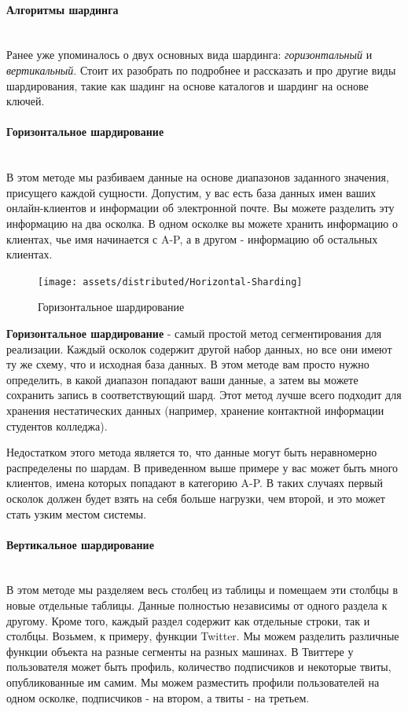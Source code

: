 \paragraph{Алгоритмы шардинга} ~\\
Ранее уже упоминалось о двух основных вида шардинга: \textit{горизонтальный} и \textit{вертикальный}. Стоит их разобрать по подробнее и
рассказать и про другие виды шардирования, такие как шадинг на основе каталогов и шардинг на основе ключей.

\paragraph{Горизонтальное шардирование} ~\\
В этом методе мы разбиваем данные на основе диапазонов заданного значения, присущего каждой сущности. Допустим, у вас
есть база данных имен ваших онлайн-клиентов и информации об электронной почте. Вы можете разделить эту информацию на
два осколка. В одном осколке вы можете хранить информацию о клиентах, чье имя начинается с A-P, а в другом - информацию
об остальных клиентах.

\begin{figure}[H]
    \centering
    \texttt{[image: assets/distributed/Horizontal-Sharding]}
    \caption{Горизонтальное шардирование}
    \label{fig:Horizontal-Sharding}
\end{figure}

\textbf{Горизонтальное шардирование} - самый простой метод сегментирования для реализации. Каждый осколок содержит
другой набор данных, но все они имеют ту же схему, что и исходная база данных. В этом методе вам просто нужно
определить, в какой диапазон попадают ваши данные, а затем вы можете сохранить запись в соответствующий шард. Этот
метод лучше всего подходит для хранения нестатических данных (например, хранение контактной информации студентов
колледжа).

Недостатком этого метода является то, что данные могут быть неравномерно распределены по шардам. В приведенном выше
примере у вас может быть много клиентов, имена которых попадают в категорию A-P. В таких случаях первый осколок должен
будет взять на себя больше нагрузки, чем второй, и это может стать узким местом системы. \autocite{DatabaseSharding}

\paragraph{Вертикальное шардирование} ~\\
В этом методе мы разделяем весь столбец из таблицы и помещаем эти столбцы в новые отдельные таблицы. Данные полностью
независимы от одного раздела к другому. Кроме того, каждый раздел содержит как отдельные строки, так и столбцы. Возьмем,
к примеру, функции Twitter. Мы можем разделить различные функции объекта на разные сегменты на разных машинах. В
Твиттере у пользователя может быть профиль, количество подписчиков и некоторые твиты, опубликованные им самим. Мы можем
разместить профили пользователей на одном осколке, подписчиков - на втором, а твиты - на третьем.

